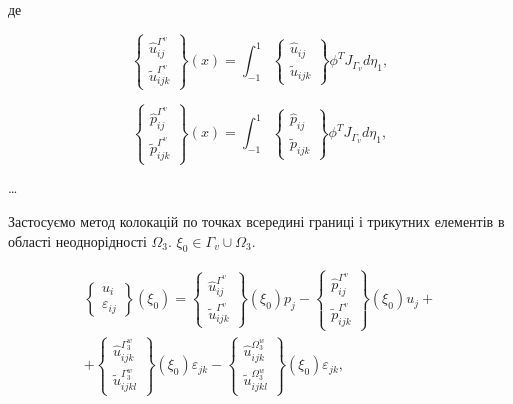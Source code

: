\noindent де

\begin{equation*}
    \left\{ \begin{array}{lr} \hat{u}_{ij}^{\Gamma^v} \\ \tilde{u}_{ijk}^{\Gamma^v} \end{array} \right\}(x) =
    \int_{-1}^{1} \left\{ \begin{array}{lr} \hat{u}_{ij} \\ \tilde{u}_{ijk} \end{array} \right\} 
    \phi^T J_{\Gamma_v} d \eta_1,
\end{equation*}

\begin{equation*}
    \left\{ \begin{array}{lr} \hat{p}_{ij}^{\Gamma^v} \\ \tilde{p}_{ijk}^{\Gamma^v} \end{array} \right\}(x) =
    \int_{-1}^{1} \left\{ \begin{array}{lr} \hat{p}_{ij} \\ \tilde{p}_{ijk} \end{array} \right\} 
    \phi^T J_{\Gamma_v} d \eta_1,
\end{equation*}

\dots

Застосуємо метод колокацій по точках всередині границі і трикутних елементів в області неоднорідності $\Omega_3$. 
$\xi_0 \in \Gamma_v \cup \Omega_3$.

\begin{equation}
    \begin{split}
        \left\{ \begin{array}{lr} u_i \\ \varepsilon_{ij}\end{array} \right\}(\xi_0) =  
        \left\{ \begin{array}{lr} \hat{u}_{ij}^{\Gamma^v} \\ \tilde{u}_{ijk}^{\Gamma^v} \end{array} \right\}(\xi_0) p_j -
        \left\{ \begin{array}{lr} \hat{p}_{ij}^{\Gamma^v} \\ \tilde{p}_{ijk}^{\Gamma^v} \end{array} \right\}(\xi_0) u_j + \\
        + \left\{ \begin{array}{lr} \hat{u}_{ijk}^{\Gamma_3^w} \\ \tilde{u}_{ijkl}^{\Gamma_3^w} \end{array} \right\}(\xi_0) 
        \varepsilon_{jk}  
        - \left\{ \begin{array}{lr} \hat{u}_{ijk}^{\Omega_3^w} \\ \tilde{u}_{ijkl}^{\Omega_3^w} \end{array} \right\}(\xi_0) 
        \varepsilon_{jk},  
    \end{split}
\end{equation}

